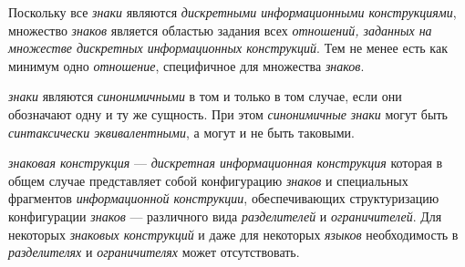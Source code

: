 Поскольку все \textit{знаки} являются \textit{дискретными информационными конструкциями}, множество \textit{знаков} является областью задания всех \textit{отношений, заданных на множестве дискретных \textit{информационных конструкций}}.
Тем не менее есть как минимум одно \textit{отношение}, специфичное для множества \textit{знаков}.

\begin{SCn}


\end{SCn}

\textit{знаки} являются \textit{синонимичными} в том и только в том случае, если они обозначают одну и ту же сущность.
При этом \textit{синонимичные знаки} могут быть \textit{синтаксически эквивалентными}, а могут и не быть таковыми.

\begin{SCn}


\end{SCn}

\textit{знаковая конструкция} --- \textit{дискретная информационная конструкция} которая в общем случае представляет собой конфигурацию \textit{знаков} и специальных фрагментов \textit{информационной конструкции}, обеспечивающих структуризацию конфигурации \textit{знаков} --- различного вида \textit{разделителей} и \textit{ограничителей}.
Для некоторых \textit{знаковых конструкций} и даже для некоторых \textit{языков} необходимость в \textit{разделителях} и \textit{ограничителях} может отсутствовать.

\begin{SCn}

        \begin{scnindent}
        \end{scnindent}

\end{SCn}

